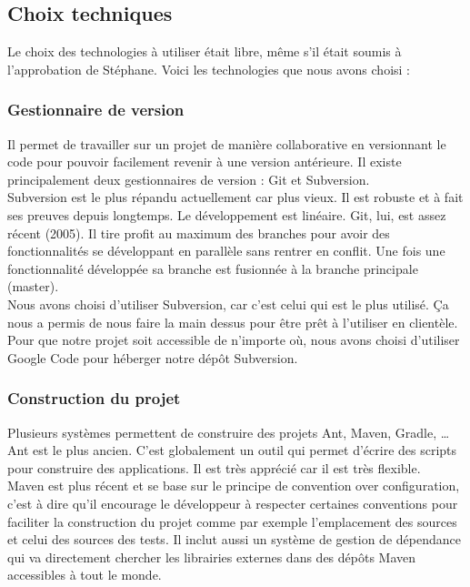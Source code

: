 \subsection{Choix techniques}

Le choix des technologies à utiliser était libre, même s'il était soumis à l'approbation de Stéphane. Voici les technologies que nous avons choisi :

\subsubsection{Gestionnaire de version}

Il permet de travailler sur un projet de manière collaborative en versionnant le code pour pouvoir facilement revenir à une version antérieure. Il existe principalement deux gestionnaires de version : Git et Subversion.\\

Subversion est le plus répandu actuellement car plus vieux. Il est robuste et à fait ses preuves depuis longtemps. Le développement est linéaire. Git, lui, est assez récent (2005). Il tire profit au maximum des branches pour avoir des fonctionnalités se développant en parallèle sans rentrer en conflit. Une fois une fonctionnalité développée sa branche est fusionnée à la branche principale (master).\\

Nous avons choisi d'utiliser Subversion, car c'est celui qui est le plus utilisé. Ça nous a permis de nous faire la main dessus pour être prêt à l'utiliser en clientèle. Pour que notre projet soit accessible de n'importe où, nous avons choisi d'utiliser Google Code \cite{capicsou-bank-svn} pour héberger notre dépôt Subversion.

\subsubsection{Construction du projet}

Plusieurs systèmes permettent de construire des projets Ant, Maven, Gradle, \dots{} Ant est le plus ancien. C'est globalement un outil qui permet d'écrire des scripts pour construire des applications. Il est très apprécié car il est très flexible.\\

Maven est plus récent et se base sur le principe de \flqq{}convention over configuration\frqq{}, c'est à dire qu'il encourage le développeur à respecter certaines conventions pour faciliter la construction du projet comme par exemple l'emplacement des sources et celui des sources des tests. Il inclut aussi un système de gestion de dépendance qui va directement chercher les librairies externes dans des dépôts Maven accessibles à tout le monde.\\

